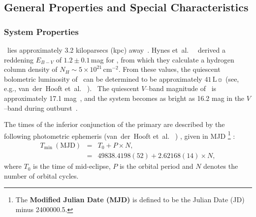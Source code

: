 
\subsection{General Properties and Special Characteristics}\label{cha:GROJ1655-40:sec:IntroductionToJ1655:subsec:PropertiesOfJ1655}


\subsubsection{System Properties}\label{cha:GROJ1655-40:sec:IntroductionToJ1655:subsec:PropertiesOfJ1655:subsubsec:SystemProperties}

\groj\ lies approximately 3.2 kiloparsecs (kpc) away~\cite{HjellmingRupen:1995}. Hynes et~al.\ %
\citeyear{Hynes_et_al.:1998}%
\ derived a reddening $E_{B-V}$ of $1.2\pm0.1$\,mag for \groj, from which
they calculate a hydrogen column density of $N_H
\sim5\times10^{21}\,\mathrm{cm}^{-2}$. From these values, the
quiescent bolometric luminosity of \groj\ can be determined to be
approximately $41\,\mathrm{L}\sun$ (see, e.g., %
van~der~Hooft et~al.\ %
).%
\ The quiescent $V$--band magnitude of \groj\ is approximately 17.1
mag~\cite{GreeneBailynOrosz:2001}, %
and the system becomes as bright as 16.2 mag in the $V$--band during
outburst~\cite{BailynOroszMcClintockRemillard:1995}. %

\vspace{\myparskip}

The times of the inferior conjunction of the primary are described by the
following photometric ephemeris (van~der~Hooft et~al.\ %
)%
, given in MJD%
\footnote{\label{cha:GROJ1655-40:sec:IntroductionToJ1655:subsec:PropertiesOfJ1655:subsubsec:SystemProperties:foot:mjd}%
The \textbf{Modified Julian Date (MJD)} is defined to be the Julian
Date (JD) minus 2400000.5.} %
:
\begin{eqnarray}\label{cha:GROJ1655-40:sec:IntroductionToJ1655:subsec:PropertiesOfJ1655:subsubsec:SystemProperties:eqn:Ephemeris}
\nonumber T_{\min}\ (\mathrm{MJD}) & = &T_0 + P \times N, \\
 & = & 49838.4198(52) + 2.62168(14) \times N,
\end{eqnarray}
where $T_0$ is the time of mid-eclipse, $P$ is the orbital period and $N$
denotes the number of orbital cycles. %

